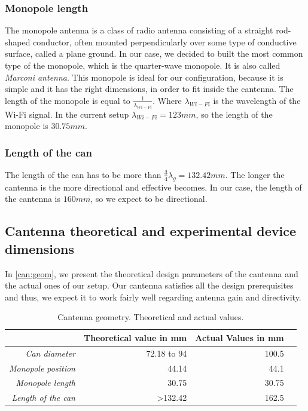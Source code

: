 \documentclass[12pt,a4paper]{article}
\begin{document}
		\subsubsection{Monopole length}
			The monopole antenna is a class of radio antenna consisting of a straight rod-shaped conductor, often mounted perpendicularly over some type of conductive surface, called a plane ground. In our case, we decided to built the most common type of the monopole, which is the quarter-wave monopole. It is also called \emph{Marconi antenna}. This monopole is ideal for our configuration, because it is simple and it has the right dimensions, in order to fit inside the cantenna. The length of the monopole is equal to $\frac{1}{\lambda_{Wi-Fi}}$. Where  $\lambda_{Wi-Fi}$ is the wavelength of the Wi-Fi signal. In the current setup $\lambda_{Wi-Fi} = 123mm$, so the length of the monopole is $30.75mm$.
		
		\subsubsection{Length of the can}
			The length of the can has to be more than $\frac{3}{4} \lambda_g = 132.42mm$. The longer the cantenna is the more directional and effective becomes. In our case, the length of the cantenna is $160mm$, so we expect to be directional.
	
	\subsection{Cantenna theoretical and experimental device dimensions} 
		In \autoref{can:geom}, we present the theoretical design parameters of the cantenna and the actual ones of our setup. Our cantenna satisfies all the design prerequisites and thus, we expect it to work fairly well regarding antenna gain and directivity.

		\begin{table}
			\begin{center}
				\begin{tabular}{r|r|r|r}\
				 & Theoretical value in mm& Actual Values in mm\\
				 \hline 
				 \emph{Can diameter} & 72.18 to 94 & 100.5\\
				 \emph{Monopole position} & 44.14 & 44.1 \\
				 \emph{Monopole length} & 30.75 & 30.75\\
				 \emph{Length of the can} & >132.42 & 162.5\\
				\end{tabular}
			\end{center}
			\caption{Cantenna geometry. Theoretical and actual values.}
			\label{can:geom}
		\end{table}
\end{document}
